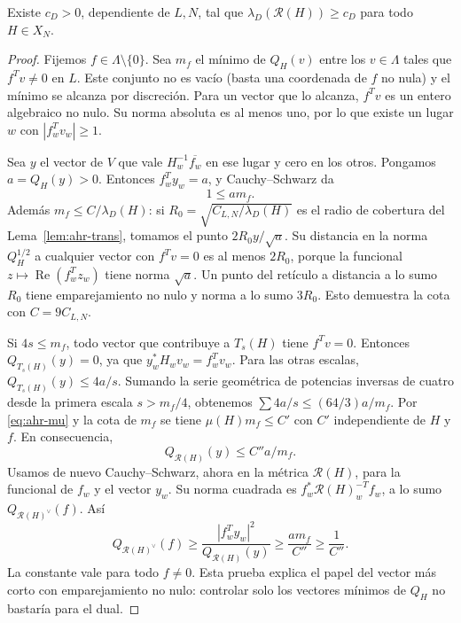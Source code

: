 \begin{proposicion}
\label{prop:ahr-dual}
Existe $c_D>0$, dependiente de $L,N$, tal que $\lambda_D(\mathcal R(H))\ge c_D$ para todo $H\in X_N$.
\end{proposicion}
\begin{proof}
Fijemos $f\in\Lambda\setminus\{0\}$. Sea $m_f$ el mínimo de $Q_H(v)$ entre los $v\in\Lambda$ tales que $f^Tv\ne0$ en $L$. Este conjunto no es vacío (basta una coordenada de $f$ no nula) y el mínimo se alcanza por discreción. Para un vector que lo alcanza, $f^Tv$ es un entero algebraico no nulo. Su norma absoluta es al menos uno, por lo que existe un lugar $w$ con $|f_w^Tv_w|\ge1$.

Sea $y$ el vector de $V$ que vale $H_w^{-1}\overline{f_w}$ en ese lugar y cero en los otros. Pongamos $a=Q_H(y)>0$. Entonces $f_w^Ty_w=a$, y Cauchy--Schwarz da
\begin{equation}
 1\le a m_f.
 \label{eq:ahr-pair}
\end{equation}
Además $m_f\le C/\lambda_D(H)$: si $R_0=\sqrt{C_{L,N}/\lambda_D(H)}$ es el radio de cobertura del Lema~\ref{lem:ahr-trans}, tomamos el punto $2R_0 y/\sqrt a$. Su distancia en la norma $Q_H^{1/2}$ a cualquier vector con $f^Tv=0$ es al menos $2R_0$, porque la funcional $z\mapsto\operatorname{Re}(f_w^Tz_w)$ tiene norma $\sqrt a$. Un punto del retículo a distancia a lo sumo $R_0$ tiene emparejamiento no nulo y norma a lo sumo $3R_0$. Esto demuestra la cota con $C=9C_{L,N}$.

Si $4s\le m_f$, todo vector que contribuye a $T_s(H)$ tiene $f^Tv=0$. Entonces $Q_{T_s(H)}(y)=0$, ya que $y_w^*H_wv_w=f_w^Tv_w$. Para las otras escalas, $Q_{T_s(H)}(y)\le4a/s$. Sumando la serie geométrica de potencias inversas de cuatro desde la primera escala $s>m_f/4$, obtenemos $\sum 4a/s\le(64/3)a/m_f$. Por \eqref{eq:ahr-mu} y la cota de $m_f$ se tiene $\mu(H)m_f\le C'$ con $C'$ independiente de $H$ y $f$. En consecuencia,
\[
 Q_{\mathcal R(H)}(y)\le C''a/m_f.
\]
Usamos de nuevo Cauchy--Schwarz, ahora en la métrica $\mathcal R(H)$, para la funcional de $f_w$ y el vector $y_w$. Su norma cuadrada es $f_w^*\mathcal R(H)_w^{-T}f_w$, a lo sumo $Q_{\mathcal R(H)^\vee}(f)$. Así
\[
 Q_{\mathcal R(H)^\vee}(f)
 \ge\frac{|f_w^Ty_w|^2}{Q_{\mathcal R(H)}(y)}
 \ge\frac{am_f}{C''}\ge\frac1{C''}.
\]
La constante vale para todo $f\ne0$. Esta prueba explica el papel del vector más corto con emparejamiento no nulo: controlar solo los vectores mínimos de $Q_H$ no bastaría para el dual.
\end{proof}

